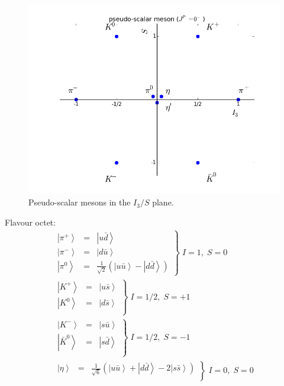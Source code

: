 \documentclass[12pt]{article}
\begin{document}
\begin{figure}[h]
\includegraphics[scale=0.75]{images/MesonOctetJ0.png}
\caption{Pseudo-scalar mesons in the $I_3/S$ plane.}\label{fig:mesonOctetJ0}
\end{figure}
Flavour octet:
\[\begin{array}{l}
\left.\begin{array}{ccc}
\left|\pi^+\right>&=&\left|u\bar d\right>\\
\left|\pi^-\right>&=&\left|d\bar u\right>\\
\left|\pi^0\right>&=&\frac{1}{\sqrt{2}}\left(\left|u\bar u\right>-\left|d\bar d\right>\right)
\end{array}
\right\} \; I=1,\;S=0\\
\left.\begin{array}{ccc}
\left|K^+\right>&=&\left|u\bar s\right>\\
\left|K^0\right>&=&\left|d\bar s\right>\\
\end{array}
\right\}\;  I=1/2,\;S=+1\\
\left.\begin{array}{ccc}
\left|K^-\right>&=&\left|s\bar u\right>\\
\left|\bar K^0\right>&=&\left|s\bar d\right>\\
\end{array}
\right\}\; I=1/2,\;S=-1\\
\left.\begin{array}{ccc}
\left|\eta\right>&=&\frac{1}{\sqrt{6}}\left(\left|u\bar u\right>+\left|d\bar d\right>-2\left|s\bar s\right>\right)\\
\end{array}
\right\}\; I=0,\;S=0
\end{array}
\]
\end{document}
